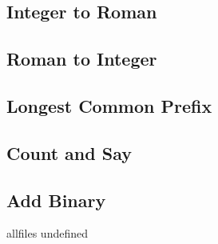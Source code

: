 \documentclass{article}
\begin{document}
\begin{CJK}{UTF8}{gbsn}     %

\else

\subsection{Integer to Roman}

\subsection{Roman to Integer}

\subsection{Longest Common Prefix}

\subsection{Count and Say}

\subsection{Add Binary}


\fi

\ifx allfiles undefined
\end{CJK}
\end{document}
